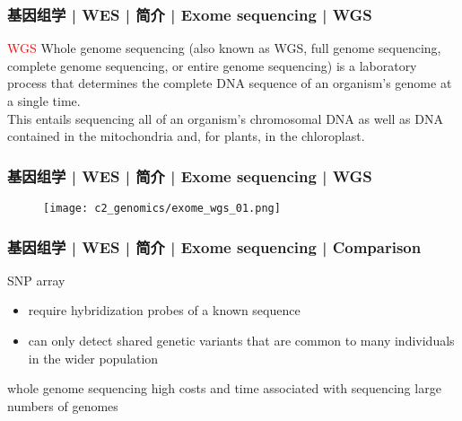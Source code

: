\begin{frame}
  \frametitle{基因组学 | WES | 简介 | Exome sequencing | WGS}
  \begin{block}{\textcolor{red}{WGS}}
    Whole genome sequencing (also known as WGS, full genome sequencing, complete genome sequencing, or entire genome sequencing) is a laboratory process that determines the complete DNA sequence of an organism's genome at a single time.\\
    \vspace{1em}
    This entails sequencing all of an organism's chromosomal DNA as well as DNA contained in the mitochondria and, for plants, in the chloroplast.
  \end{block}
\end{frame}

\begin{frame}
  \frametitle{基因组学 | WES | 简介 | Exome sequencing | WGS}
  \begin{figure}
    \centering
    \texttt{[image: c2\_genomics/exome\_wgs\_01.png]}
  \end{figure}
\end{frame}

\begin{frame}
  \frametitle{基因组学 | WES | 简介 | Exome sequencing | Comparison}
  \begin{block}{SNP array}
    \begin{itemize}
      \item require hybridization probes of a known sequence
      \item can only detect shared genetic variants that are common to many individuals in the wider population
    \end{itemize}
  \end{block}
  \pause
  \begin{block}{whole genome sequencing}
    high costs and time associated with sequencing large numbers of genomes
  \end{block}
\end{frame}

